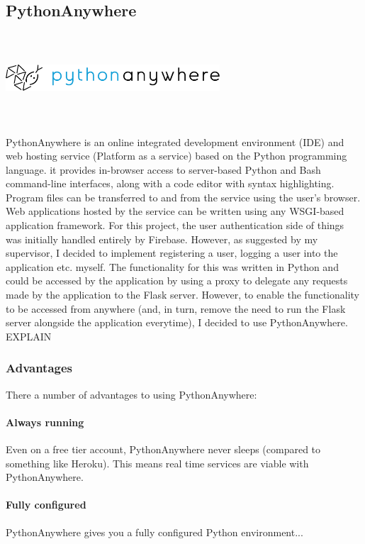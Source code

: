 \subsection{PythonAnywhere}
\par
\medskip
\begin{center}
    \includegraphics[width=8cm,height=3.3cm,keepaspectratio]{images/pythonanywhere}
\end{center}
PythonAnywhere is an online integrated development environment (IDE) and web hosting service (Platform as a service) based on the Python programming language. it provides in-browser access to server-based Python and Bash command-line interfaces, along with a code editor with syntax highlighting. Program files can be transferred to and from the service using the user's browser. Web applications hosted by the service can be written using any WSGI-based application framework. For this project, the user authentication side of things was initially handled entirely by Firebase. However, as suggested by my supervisor, I decided to implement registering a user, logging a user into the application etc. myself. The functionality for this was written in Python and could be accessed by the application by using a proxy to delegate any requests made by the application to the Flask server. However, to enable the functionality to be accessed from anywhere (and, in turn, remove the need to run the Flask server alongside the application everytime), I decided to use PythonAnywhere. EXPLAIN

\subsubsection{Advantages}
There a number of advantages to using PythonAnywhere:

\paragraph{Always running}
Even on a free tier account, PythonAnywhere never sleeps (compared to something like Heroku). This means real time services are viable with PythonAnywhere.

\paragraph{Fully configured}
PythonAnywhere gives you a fully configured Python environment...

